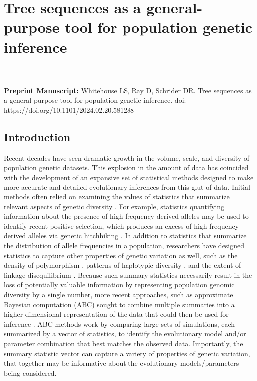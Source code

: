 \chapter{Tree sequences as a general-purpose tool for population genetic inference}

\\
\\
\textbf{Preprint Manuscript:} Whitehouse LS, Ray D, Schrider DR. Tree sequences as a general-purpose tool for population genetic inference. doi: https://doi.org/10.1101/2024.02.20.581288

\section{Introduction}

Recent decades have seen dramatic growth in the volume, scale, and diversity of population genetic datasets. This explosion in the amount of data has coincided with the development of an expansive set of statistical methods designed to make more accurate and detailed evolutionary inferences from this glut of data. Initial methods often relied on examining the values of statistics that summarize relevant aspects of genetic diversity \cite{fuStatisticalTestsNeutrality1993,neiMathematicalModelStudying1979,tajimaStatisticalMethodTesting1989,wattersonNumberSegregatingSites1975}. For example, statistics quantifying information about the presence of high-frequency derived alleles may be used to identify recent positive selection, which produces an excess of high-frequency derived alleles via genetic hitchhiking \cite{fayHitchhikingPositiveDarwinian2000}. In addition to statistics that summarize the distribution of allele frequencies in a population, researchers have designed statistics to capture other properties of genetic variation as well, such as the density of polymorphism \cite{neiMathematicalModelStudying1979,neiDNAPolymorphismDetectable1981}, patterns of haplotypic diversity \cite{garudRecentSelectiveSweeps2015,hudsonEvidencePositiveSelection1994,sabetiDetectingRecentPositive2002,voightMapRecentPositive2006}, and the extent of linkage disequilibrium \cite{kellyTestNeutralityBased1997,kimLinkageDisequilibriumSignature2004}. Because such summary statistics necessarily result in the loss of potentially valuable information by representing population genomic diversity by a single number, more recent approaches, such as approximate Bayesian computation (ABC) sought to combine multiple summaries into a higher-dimensional representation of the data that could then be used for inference \cite{beaumontApproximateBayesianComputation2002,pritchardPopulationGrowthHuman1999,tavareInferringCoalescenceTimes1997}. ABC methods work by comparing large sets of simulations, each summarized by a vector of statistics, to identify the evolutionary model and/or parameter combination that best matches the observed data. Importantly, the summary statistic vector can capture a variety of properties of genetic variation, that together may be informative about the evolutionary models/parameters being considered.

